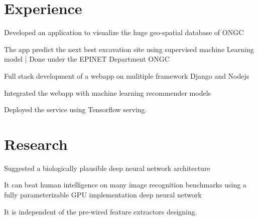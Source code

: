 \documentclass[]{deedy-resume-openfont}
\begin{document}
\begin{minipage}[t]{0.33\textwidth}
%
%

\end{minipage} 
\hfill
\begin{minipage}[t]{0.66\textwidth} 


\section{Experience}

\vspace{\topsep} %
\begin{tightemize}\item Developed an application to visualize the huge geo-spatial database of ONGC \item The app predict the next best excavation site using supervised machine Learning model | Done under the EPINET Department ONGC
\end{tightemize}
\sectionsep

\begin{tightemize}
\item Full stack development of a webapp on mulitiple framework Django and Nodejs\item Integrated the webapp with machine learning recommender models\item Deployed the service using Tensorflow serving.\end{tightemize}
\sectionsep

\section{Research}
\begin{tightemize}
\item Suggested a biologically plausible deep neural network architecture \item It can beat human intelligence on many image recognition benchmarks using a fully parameterizable GPU implementation deep neural network \item It is independent of the pre-wired feature extractors designing.\end{tightemize}
\sectionsep


\end{minipage}
\end{document}
